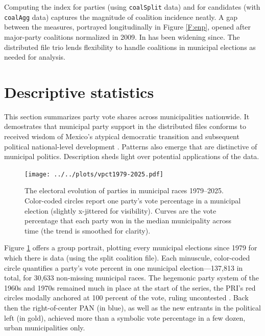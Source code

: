 \documentclass[letter,12pt]{article}
\begin{document}
Computing the \citet{laakso.taagepera.1979} index for parties (using \verb|coalSplit| data) and for candidates (with \verb|coalAgg| data) captures the magnitude of coalition incidence neatly. A gap between the measures, portrayed longitudinally in Figure \ref{F:enp}, opened after major-party coalitions normalized in 2009. In has been widening since. The distributed file trio lends flexibility to handle coalitions in municipal elections as needed for analysis.

\section{Descriptive statistics}

This section summarizes party vote shares across municipalities nationwide. It demostrates that municipal party support in the distributed files conforms to received wisdom of Mexico's atypical democratic transition \citep[eg.][]{cornelius.1996} and subsequent political national-level development \citep[eg.][]{cornelius.weldonCPT2018}. Patterns also emerge that are distinctive of municipal politics. Description sheds light over potential applications of the data.

\begin{figure}
  \texttt{[image: ../../plots/vpct1979-2025.pdf]}
  \caption{The electoral evolution of parties in municipal races 1979--2025. Color-coded circles report one party's vote percentage in a municipal election (slightly x-jittered for visibility). Curves are the vote percentage that each party won in the median municipality across time (the trend is smoothed for clarity).}\label{F:vpcts}
\end{figure}  

Figure \ref{F:vpcts} offers a group portrait, plotting every municipal elections since 1979 for which there is data (using the split coalition file). Each minuscule, color-coded circle quantifies a party's vote percent in one municipal election---137,813 in total, for 30,633 non-missing municipal races. The hegemonic party system of the 1960s and 1970s remained much in place at the start of the series, the PRI's red circles modally anchored at 100 percent of the vote, ruling uncontested \citep{segovia.els1979}. Back then the right-of-center PAN (in blue), as well as the new entrants in the political left (in gold), achieved more than a symbolic vote percentage in a few dozen, urban municipalities only.
\end{document}
